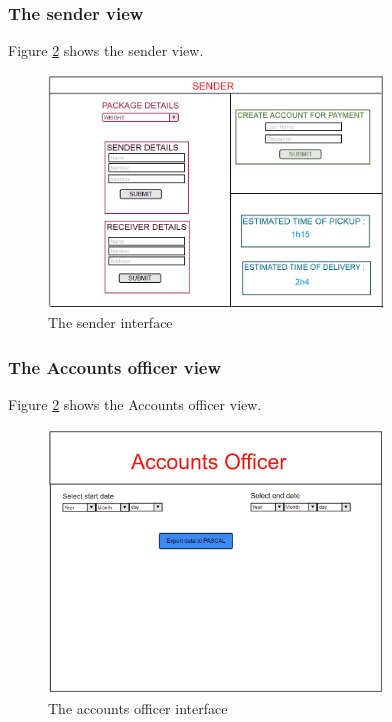 \documentclass[paper=a4, fontsize=11pt]{scrartcl} %
\numberwithin{equation}{section} %
\numberwithin{figure}{section} %
\numberwithin{table}{section} %
\begin{document}
\subsubsection{The sender view}
Figure \ref{Sender} shows the sender view.
\begin{figure}[h!]
\centering
\includegraphics[width=3.5in]{pictures/sender.png}
\caption{The sender interface}
\label{Sender}
\end{figure}

\subsubsection{The Accounts officer view}
Figure \ref{Sender} shows the Accounts officer view.
\begin{figure}[h!]
\centering
\includegraphics[width=3.5in]{pictures/accounts.png}
\caption{The accounts officer interface}
\label{Sender}
\end{figure}
\end{document}
